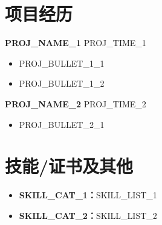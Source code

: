 \documentclass[10pt, a4paper]{article}
\newcommand{\expheader}[4]{%
    \vspace{3pt}%
    {\bfseries #1} \hfill {#3} \\
    {#2} \hfill {#4}%
    \vspace{3pt}%
}
\newcommand{\projheader}[2]{%
    \vspace{3pt}%
    {\bfseries #1} \hfill {#2}%
    \vspace{3pt}%
}
\begin{document}


\section{项目经历}

\projheader{{{PROJ_NAME_1}}}{{{PROJ_TIME_1}}}
\begin{itemize}
    \item {{PROJ_BULLET_1_1}}
    \item {{PROJ_BULLET_1_2}}
\end{itemize}

\projheader{{{PROJ_NAME_2}}}{{{PROJ_TIME_2}}}
\begin{itemize}
    \item {{PROJ_BULLET_2_1}}
\end{itemize}

\section{技能/证书及其他}

\begin{itemize}
    \item \textbf{{{SKILL_CAT_1}}：}{{SKILL_LIST_1}}
    \item \textbf{{{SKILL_CAT_2}}：}{{SKILL_LIST_2}}
\end{itemize}
\end{document}
